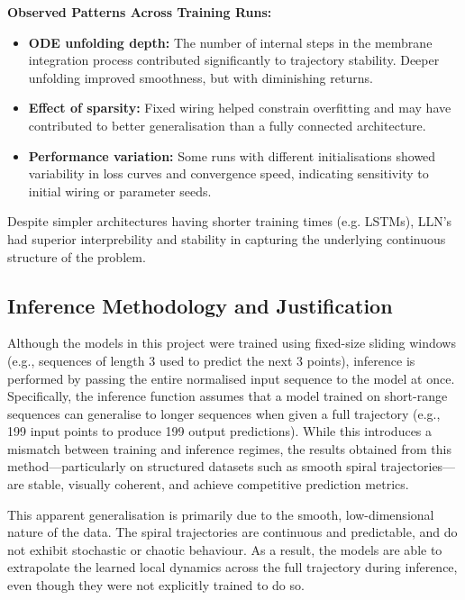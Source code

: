 \vspace{1em}
\noindent \textbf{Observed Patterns Across Training Runs:}
\begin{itemize}
    \item \textbf{ODE unfolding depth:} The number of internal steps in the membrane integration process contributed significantly to trajectory stability. Deeper unfolding improved smoothness, but with diminishing returns.
    \item \textbf{Effect of sparsity:} Fixed wiring helped constrain overfitting and may have contributed to better generalisation than a fully connected architecture.
    \item \textbf{Performance variation:} Some runs with different initialisations showed variability in loss curves and convergence speed, indicating sensitivity to initial wiring or parameter seeds.
\end{itemize}

Despite simpler architectures having shorter training times (e.g. LSTMs), LLN's had superior interprebility and stability in capturing the underlying continuous structure of the problem.


\subsection*{Inference Methodology and Justification}

Although the models in this project were trained using fixed-size sliding windows (e.g., sequences of length 3 used to predict the next 3 points), inference is performed by passing the entire normalised input sequence to the model at once. Specifically, the inference function assumes that a model trained on short-range sequences can generalise to longer sequences when given a full trajectory (e.g., 199 input points to produce 199 output predictions). While this introduces a mismatch between training and inference regimes, the results obtained from this method---particularly on structured datasets such as smooth spiral trajectories---are stable, visually coherent, and achieve competitive prediction metrics.

This apparent generalisation is primarily due to the smooth, low-dimensional nature of the data. The spiral trajectories are continuous and predictable, and do not exhibit stochastic or chaotic behaviour. As a result, the models are able to extrapolate the learned local dynamics across the full trajectory during inference, even though they were not explicitly trained to do so.

